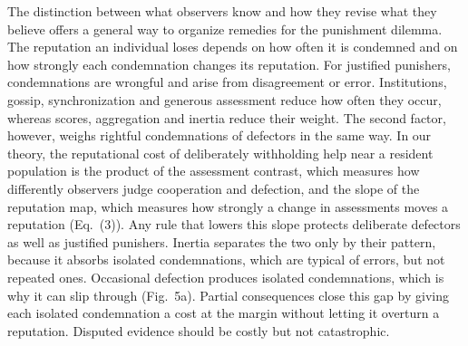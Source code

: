 The distinction between what observers know and how they revise what they believe offers a general way to organize remedies for the punishment dilemma. The reputation an individual loses depends on how often it is condemned and on how strongly each condemnation changes its reputation. For justified punishers, condemnations are wrongful and arise from disagreement or error. Institutions, gossip, synchronization and generous assessment reduce how often they occur\cite{radzvilavicius2021,kawakatsu2024,murase2024synchronization,schmid2021}, whereas scores, aggregation and inertia reduce their weight\cite{schmid2023,michelmata2024}. The second factor, however, weighs rightful condemnations of defectors in the same way. In our theory, the reputational cost of deliberately withholding help near a resident population is the product of the assessment contrast, which measures how differently observers judge cooperation and defection, and the slope of the reputation map, which measures how strongly a change in assessments moves a reputation (Eq.~(3)). Any rule that lowers this slope protects deliberate defectors as well as justified punishers. Inertia separates the two only by their pattern, because it absorbs isolated condemnations, which are typical of errors, but not repeated ones. Occasional defection produces isolated condemnations, which is why it can slip through (Fig.~5a). Partial consequences close this gap by giving each isolated condemnation a cost at the margin without letting it overturn a reputation. Disputed evidence should be costly but not catastrophic.

